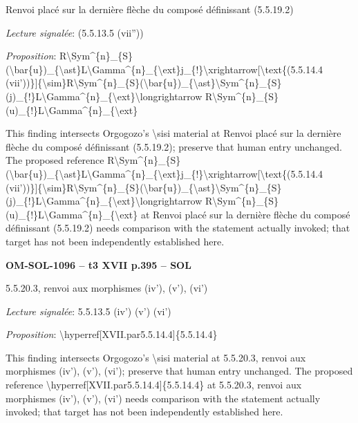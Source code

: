 Renvoi placé sur la dernière flèche du composé définissant (5.5.19.2)\par
\emph{Lecture signalée}: (5.5.13.5 (vii''))\par
\emph{Proposition}: R\textbackslash{}Sym\textasciicircum{}\{n\}\_\{S\}(\textbackslash{}bar\{u\})\_\{\textbackslash{}ast\}L\textbackslash{}Gamma\textasciicircum{}\{n\}\_\{\textbackslash{}ext\}j\_\{!\}\textbackslash{}xrightarrow[\textbackslash{}text\{(5.5.14.4 (vii'))\}]\{\textbackslash{}sim\}R\textbackslash{}Sym\textasciicircum{}\{n\}\_\{S\}(\textbackslash{}bar\{u\})\_\{\textbackslash{}ast\}\textbackslash{}Sym\textasciicircum{}\{n\}\_\{S\}(j)\_\{!\}L\textbackslash{}Gamma\textasciicircum{}\{n\}\_\{\textbackslash{}ext\}\textbackslash{}longrightarrow R\textbackslash{}Sym\textasciicircum{}\{n\}\_\{S\}(u)\_\{!\}L\textbackslash{}Gamma\textasciicircum{}\{n\}\_\{\textbackslash{}ext\}\par
This finding intersects Orgogozo's \textbackslash{}sisi material at Renvoi placé sur la dernière flèche du composé définissant (5.5.19.2); preserve that human entry unchanged. The proposed reference R\textbackslash{}Sym\textasciicircum{}\{n\}\_\{S\}(\textbackslash{}bar\{u\})\_\{\textbackslash{}ast\}L\textbackslash{}Gamma\textasciicircum{}\{n\}\_\{\textbackslash{}ext\}j\_\{!\}\textbackslash{}xrightarrow[\textbackslash{}text\{(5.5.14.4 (vii'))\}]\{\textbackslash{}sim\}R\textbackslash{}Sym\textasciicircum{}\{n\}\_\{S\}(\textbackslash{}bar\{u\})\_\{\textbackslash{}ast\}\textbackslash{}Sym\textasciicircum{}\{n\}\_\{S\}(j)\_\{!\}L\textbackslash{}Gamma\textasciicircum{}\{n\}\_\{\textbackslash{}ext\}\textbackslash{}longrightarrow R\textbackslash{}Sym\textasciicircum{}\{n\}\_\{S\}(u)\_\{!\}L\textbackslash{}Gamma\textasciicircum{}\{n\}\_\{\textbackslash{}ext\} at Renvoi placé sur la dernière flèche du composé définissant (5.5.19.2) needs comparison with the statement actually invoked; that target has not been independently established here.\par
\par\noindent\textbf{OM-SOL-1096 -- t3 XVII p.395 -- SOL}\par
5.5.20.3, renvoi aux morphismes (iv'), (v'), (vi')\par
\emph{Lecture signalée}: 5.5.13.5 (iv') (v') (vi')\par
\emph{Proposition}: \textbackslash{}hyperref[XVII.par5.5.14.4]\{5.5.14.4\}\par
This finding intersects Orgogozo's \textbackslash{}sisi material at 5.5.20.3, renvoi aux morphismes (iv'), (v'), (vi'); preserve that human entry unchanged. The proposed reference \textbackslash{}hyperref[XVII.par5.5.14.4]\{5.5.14.4\} at 5.5.20.3, renvoi aux morphismes (iv'), (v'), (vi') needs comparison with the statement actually invoked; that target has not been independently established here.\par
